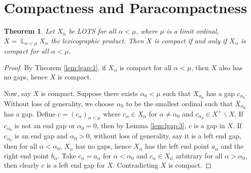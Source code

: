 \documentclass[12pt,oneside,english]{amsbook}
\numberwithin{equation}{section} %
\numberwithin{figure}{section} %
\theoremstyle{plain}
\numberwithin{section}{chapter}
\newtheorem{thm}{Theorem}[section]
\theoremstyle{plain}
\DeclareMathOperator{\LP}{\mathbb{L}}
\begin{document}
\section{Compactness and Paracompactness}
\begin{thm}\label{lp:thm:3}
  Let $X_{\alpha}$ be LOTS for all $\alpha < \mu$, where $\mu$ is a limit ordinal, $X = \LP_{\alpha < \mu} X_{\alpha}$ the lexicographic product. Then $X$ is compact if and only if $X_{\alpha}$ is compact for all $\alpha < \mu$.
\end{thm}
\begin{proof}
  By Theorem \ref{lem:lgap:1}, if $X_{\alpha}$ is compact for all $\alpha < \mu$, then $X$ also has no gaps, hence $X$ is compact.

  Now, say $X$ is compact. Suppose there exists $\alpha_{0} < \mu$ such that $X_{\alpha_{0}}$ has a gap $c_{\alpha_{0}}$. Without loss of generality, we choose $\alpha_{0}$ to be the smallest ordinal such that $X_{\alpha_{0}}$ has a gap. Define $c = (c_{\alpha})_{\alpha < \mu}$ where $c_{\alpha} \in X_{\alpha}$ for $\alpha \neq \alpha_{0}$ and $c_{\alpha_0} \in X^+ \backslash X$. If $c_{\alpha_{0}}$ is not an end gap or $\alpha_0 = 0$, then by Lemma \ref{lem:lgap:3}, $c$ is a gap in $X$. If $c_{\alpha_{0}}$ is an end gap and $\alpha_0 > 0$, without loss of generality, say it is a left end gap, then for all $\alpha < \alpha_{0}$, $X_{\alpha}$ has no gaps, hence $X_{\alpha}$ has the left end point $a_{\alpha}$ and the right end point $b_{\alpha}$. Take $c_{\alpha} = a_{\alpha}$ for $\alpha < \alpha_{0}$ and $c_{\alpha} \in X_{\alpha}$ arbitrary for all $\alpha > \alpha_0$, then clearly $c$ is a left end gap for $X$. Contradicting $X$ is compact.
\end{proof}
\end{document}
